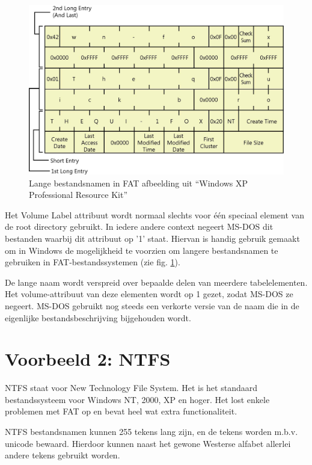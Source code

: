 \begin{figure}
\begin{center}
\includegraphics[width=\textwidth]{images/fig0415.jpg}
\caption{Lange bestandsnamen in FAT \tiny{afbeelding uit ``Windows XP Professional Resource Kit''}}
\label{fatlangnaam}
\end{center}
\end{figure}


Het Volume Label attribuut wordt normaal slechts voor \'e\'en
speciaal element van de root directory gebruikt. In iedere andere
context negeert MS-DOS dit bestanden waarbij dit attribuut op '1'
staat. Hiervan is handig gebruik gemaakt om in Windows de mogelijkheid
te voorzien om langere bestandsnamen te gebruiken in
FAT-bestandssystemen (zie fig. \ref{fatlangnaam}).

De lange naam wordt verspreid over bepaalde delen van meerdere
tabelelementen. Het volume-attribuut van deze elementen wordt op 1
gezet, zodat MS-DOS ze negeert. MS-DOS gebruikt nog steeds een
verkorte versie van de naam die in de eigenlijke bestandsbeschrijving
bijgehouden wordt.

\section{Voorbeeld 2: NTFS}

NTFS staat voor New Technology File System. Het is het standaard
bestandssysteem voor Windows NT, 2000, XP en hoger. Het lost
enkele problemen met FAT op en bevat heel wat extra
functionaliteit.

NTFS bestandsnamen kunnen 255 tekens lang zijn, en de tekens
worden m.b.v. unicode bewaard. Hierdoor kunnen naast het gewone Westerse
alfabet allerlei andere tekens gebruikt worden.

